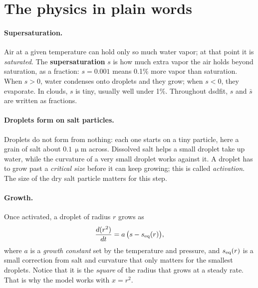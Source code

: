 \documentclass[11pt]{article}
\newcommand{\um}{\ensuremath{\,\upmu\mathrm{m}}\xspace}
\newcommand{\sbar}{\bar s}
\begin{document}
\section{The physics in plain words}\label{sec:physics}

\paragraph{Supersaturation.} Air at a given temperature can hold only so much water vapor; at that point it
is \emph{saturated}. The \textbf{supersaturation} $s$ is how much extra vapor the air holds beyond
saturation, as a fraction: $s = 0.001$ means 0.1\% more vapor than saturation. When $s > 0$, water
condenses onto droplets and they grow; when $s < 0$, they evaporate. In clouds, $s$ is tiny, usually
well under 1\%. Throughout dsdfit, $s$ and $\sbar$ are written as fractions.

\paragraph{Droplets form on salt particles.} Droplets do not form from nothing: each one starts on a tiny
particle, here a grain of salt about $0.1\um$ across. Dissolved salt helps a small droplet take up water,
while the curvature of a very small droplet works against it. A droplet has to grow past a \emph{critical
size} before it can keep growing; this is called \emph{activation}. The size of the dry salt particle
matters for this step.

\paragraph{Growth.} Once activated, a droplet of radius $r$ grows as
\begin{equation}
\frac{d(r^2)}{dt} = a\,\big(s - s_{\rm eq}(r)\big),
\label{eq:growth}
\end{equation}
where $a$ is a \emph{growth constant} set by the temperature and pressure, and $s_{\rm eq}(r)$ is a small
correction from salt and curvature that only matters for the smallest droplets. Notice that it is the
\emph{square} of the radius that grows at a steady rate. That is why the model works with $x = r^2$.
\end{document}
